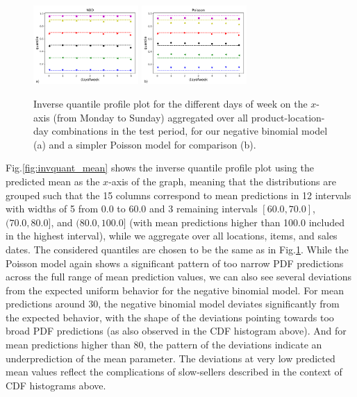 \documentclass[BCOR=1mm, DIV=calc,10pt,
twoside=true,
twocolumn,
headings=normal]{scrartcl}
\newcommand{\fig}{Fig.}
\begin{document}
\begin{figure}
\begin{center}
\includegraphics[width=4cm]{../figures/invquant_dayofweek_nbinom}
\includegraphics[width=4cm]{../figures/invquant_dayofweek_poisson}
\caption{\label{fig:invquant_dayofweek} Inverse quantile profile plot for the different days of week on the $x$-axis (from Monday to Sunday) aggregated over all product-location-day combinations in the test period, for our negative binomial model (a) and a simpler Poisson model for comparison (b).}
\end{center}
\end{figure}

\fig \ref{fig:invquant_mean} shows the inverse quantile profile plot using the predicted mean as the $x$-axis of the graph, meaning that the distributions are grouped such that the 15 columns correspond to mean predictions in 12 intervals with widths of 5 from 0.0 to 60.0 and 3 remaining intervals $[60.0, 70.0]$, $(70.0, 80.0]$, and $(80.0, 100.0]$ (with mean predictions higher than 100.0 included in the highest interval), while we aggregate over all locations, items, and sales dates. The considered quantiles are chosen to be the same as in \fig \ref{fig:invquant_dayofweek}. While the Poisson model again shows a significant pattern of too narrow PDF predictions across the full range of mean prediction values, we can also see several deviations from the expected uniform behavior for the negative binomial model. For mean predictions around $30$, the negative binomial model deviates significantly from the expected behavior, with the shape of the deviations pointing towards too broad PDF predictions (as also observed in the CDF histogram above). And for mean predictions higher than $80$, the pattern of the deviations indicate an underprediction of the mean parameter. The deviations at very low predicted mean values reflect the complications of slow-sellers described in the context of CDF histograms above.
\end{document}
